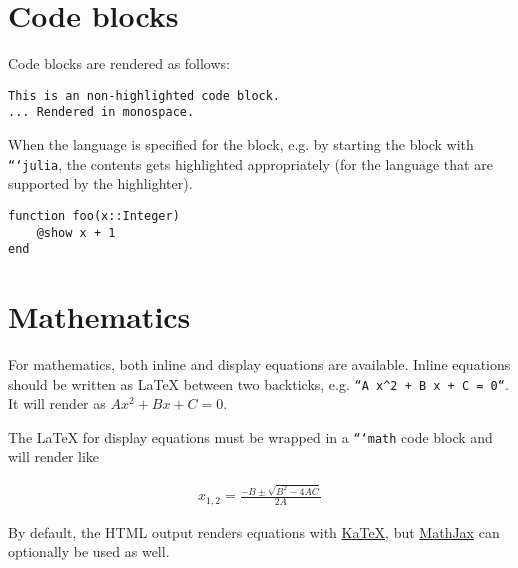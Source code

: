 \section{Code blocks}



\label{14660894509460337656}{}


Code blocks are rendered as follows:




\begin{verbatim}
This is an non-highlighted code block.
... Rendered in monospace.
\end{verbatim}



When the language is specified for the block, e.g. by starting the block with \texttt{```julia}, the contents gets highlighted appropriately (for the language that are supported by the highlighter).




\begin{verbatim}
function foo(x::Integer)
    @show x + 1
end
\end{verbatim}



\section{Mathematics}



\label{9406902154236239312}{}


For mathematics, both inline and display equations are available. Inline equations should be written as LaTeX between two backticks, e.g. \texttt{``A x{\textasciicircum}2 + B x + C = 0``}. It will render as \(A x^2 + B x + C = 0\).



The LaTeX for display equations must be wrapped in a \texttt{```math} code block and will render like



\begin{equation*}
\begin{split}x_{1,2} = \frac{-B \pm \sqrt{B^2 - 4 A C}}{2A}\end{split}\end{equation*}


By default, the HTML output renders equations with \href{https://katex.org/}{KaTeX}, but \href{https://www.mathjax.org/}{MathJax} can optionally be used as well.



